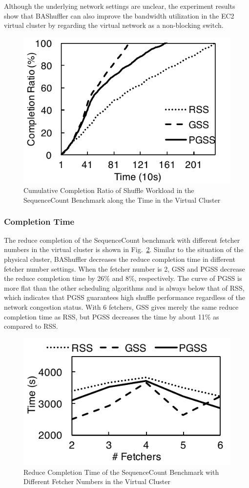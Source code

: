 \documentclass[10pt,journal,compsoc]{IEEEtran}
\begin{document}
Although the underlying network settings are unclear, the experiment
results show that BAShuffler can also improve the bandwidth
utilization in the EC2 virtual cluster by regarding the virtual
network as a non-blocking switch.

\begin{figure}[!t]
\centering
\includegraphics[width=0.7\columnwidth,height=0.4\columnwidth]{figure9}
\caption{Cumulative Completion Ratio of Shuffle Workload in the SequenceCount Benchmark along the Time in the Virtual Cluster}
\label{fig:r_vshuffle_timeline}
\end{figure}

\subsubsection{Completion Time}
The reduce completion of the SequenceCount benchmark with different fetcher numbers in the virtual cluster is shown in Fig.~\ref{fig:r_vsequence}. 
Similar to the situation of the physical cluster,
BAShuffler decreases the reduce
completion time in different fetcher number settings.
When the fetcher number is 2, GSS and PGSS decrease the reduce
completion time by 26\% and 8\%, respectively.
The curve of PGSS is more flat than the other scheduling algorithms and is always below that of RSS, 
which indicates that PGSS guarantees high shuffle performance regardless of the network congestion status.
With 6 fetchers, GSS gives merely the same reduce completion time as RSS, but PGSS
decreases the time by about 11\% as compared to RSS. 



\begin{figure}[!t]
\centering
\includegraphics[width=0.7\columnwidth,height=0.4\columnwidth]{figure10}
\caption{Reduce Completion Time of the SequenceCount Benchmark with Different Fetcher Numbers
in the Virtual Cluster}
\label{fig:r_vsequence}
\end{figure}
\end{document}
